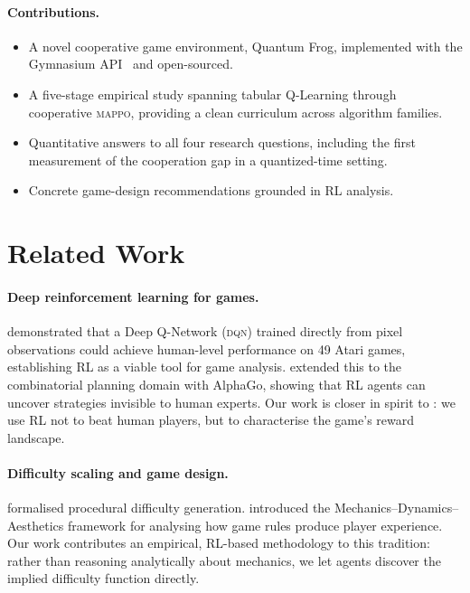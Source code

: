\documentclass[12pt]{article}
\newcommand{\MAPPO}{\textsc{mappo}}
\newcommand{\DQN}{\textsc{dqn}}
\begin{document}
\paragraph{Contributions.}
\begin{itemize}
  \item A novel cooperative game environment, Quantum Frog, implemented with
        the Gymnasium API~\citep{towers2023gymnasium} and open-sourced.
  \item A five-stage empirical study spanning tabular Q-Learning through
        cooperative \MAPPO, providing a clean curriculum across algorithm
        families.
  \item Quantitative answers to all four research questions, including the
        first measurement of the cooperation gap in a quantized-time setting.
  \item Concrete game-design recommendations grounded in RL analysis.
\end{itemize}

\section{Related Work}
\label{sec:related}

\paragraph{Deep reinforcement learning for games.}
\citet{mnih2015human} demonstrated that a Deep Q-Network (\DQN) trained
directly from pixel observations could achieve human-level performance on 49
Atari games, establishing RL as a viable tool for game analysis.
\citet{silver2016mastering} extended this to the combinatorial planning domain
with AlphaGo, showing that RL agents can uncover strategies invisible to human
experts.  Our work is closer in spirit to \citet{mnih2015human}: we use RL not
to beat human players, but to characterise the game's reward landscape.

\paragraph{Difficulty scaling and game design.}
\citet{smith2010launchpad} formalised procedural difficulty generation.
\citet{hunicke2004mda} introduced the Mechanics–Dynamics–Aesthetics framework
for analysing how game rules produce player experience.  Our work contributes
an empirical, RL-based methodology to this tradition: rather than reasoning
analytically about mechanics, we let agents discover the implied difficulty
function directly.
\end{document}
